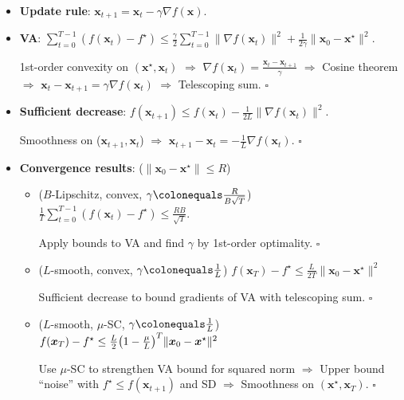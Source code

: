 \documentclass[8pt,a4paper]{extarticle}
\renewcommand{\proof}[1]{\begin{tcolorbox}#1 \hfill $\square$\end{tcolorbox}}
\newcommand{\lft}{\mathopen{}\mathclose\bgroup\left}
\newcommand{\rgt}{\aftergroup\egroup\right}
\renewcommand{\vec}[1]{\bm{#1}}
\newenvironment{topic}[1]
{\textbf{\sffamily \colorbox{black}{\rlap{\textbf{\textcolor{white}{#1}}}\hspace{\linewidth}\hspace{-2\fboxsep}}} \\ \vspace{0.2cm}}
{}
\begin{document}
\begin{multicols*}{2}
    \begin{topic}{Gradient descent}
        \begin{itemize}
            \item \textbf{Update rule}: $\vec{x}_{t+1} = \vec{x}_t - \gamma \nabla f(\vec{x})$.
            \item \textbf{VA}: $\sum_{t=0}^{T-1} (f(\vec{x}_t) - f^\star) \leq \frac{\gamma}{2} \sum_{t=0}^{T-1} \| \nabla f(\vec{x}_t) \|^2 + \frac{1}{2 \gamma} \| \vec{x}_0 - \vec{x}^\star \|^2$.
                  \proof{1st-order convexity on $(\vec{x}^\star, \vec{x}_t)$ $\Rightarrow$ $\nabla f(\vec{x}_t) = \frac{\vec{x}_t - \vec{x}_{t+1}}{\gamma}$ $\Rightarrow$ Cosine theorem $\Rightarrow$ $\vec{x}_t - \vec{x}_{t+1} = \gamma \nabla f(\vec{x}_t)$ $\Rightarrow$ Telescoping sum.}
            \item \textbf{Sufficient decrease}: $f(\vec{x}_{t+1}) \leq f(\vec{x}_t) - \frac{1}{2L} \| \nabla f(\vec{x}_t) \|^2$.
                  \proof{Smoothness on ($\vec{x}_{t+1}, \vec{x}_t$) $\Rightarrow$ $\vec{x}_{t+1} - \vec{x}_t = -\frac{1}{L} \nabla f(\vec{x}_t)$.}
            \item \textbf{Convergence results}: ($\| \vec{x}_0 - \vec{x}^\star \| \leq R$)
                  \begin{itemize}
                      \item ($B$-Lipschitz, convex, $\gamma \colonequals \frac{R}{B \sqrt{T}}$) $\frac{1}{T} \sum_{t=0}^{T-1} (f(\vec{x}_t) - f^\star) \leq \frac{RB}{\sqrt{T}}$.
                            \proof{Apply bounds to VA and find $\gamma$ by 1st-order optimality.}
                      \item ($L$-smooth, convex, $\gamma \colonequals \frac{1}{L}$) $f(\vec{x}_T) - f^\star \leq \frac{L}{2T} \| \vec{x}_0 - \vec{x}^\star \|^2$
                            \proof{Sufficient decrease to bound gradients of VA with telescoping sum.}
                      \item ($L$-smooth, $\mu$-SC, $\gamma \colonequals \frac{1}{L}$) $f(\vec{x}_T) - f^\star \leq \frac{L}{2} \lft( 1 - \frac{\mu}{L} \rgt)^T \| \vec{x}_0 - \vec{x}^\star \|^2$
                            \proof{Use $\mu$-SC to strengthen VA bound for squared norm $\Rightarrow$ Upper bound ``noise'' with $f^\star \leq f(\vec{x}_{t+1})$ and SD $\Rightarrow$ Smoothness on $(\vec{x}^\star, \vec{x}_T)$.}
                  \end{itemize}
        \end{itemize}
    \end{topic}


\end{multicols*}
\end{document}
